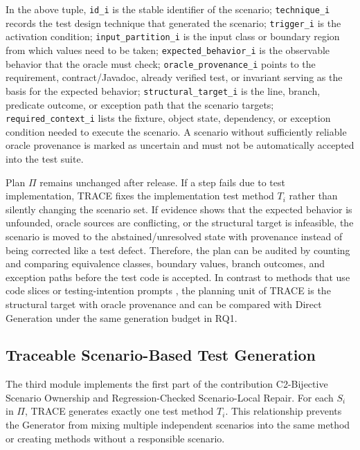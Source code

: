 \documentclass[pdflatex,sn-basic,Numbered,iicol]{sn-jnl}
\begin{document}
In the above tuple, \texttt{id\_i} is the stable identifier of the scenario; \texttt{technique\_i} records the test design technique that generated the scenario; \texttt{trigger\_i} is the activation condition; \texttt{input\_partition\_i} is the input class or boundary region from which values need to be taken; \texttt{expected\_behavior\_i} is the observable behavior that the oracle must check; \texttt{oracle\_provenance\_i} points to the requirement, contract/Javadoc, already verified test, or invariant serving as the basis for the expected behavior; \texttt{structural\_target\_i} is the line, branch, predicate outcome, or exception path that the scenario targets; \texttt{required\_context\_i} lists the fixture, object state, dependency, or exception condition needed to execute the scenario. A scenario without sufficiently reliable oracle provenance is marked as uncertain and must not be automatically accepted into the test suite.

Plan \ensuremath{\Pi} remains unchanged after release. If a step fails due to test implementation, TRACE fixes the implementation test method $T_i$ rather than silently changing the scenario set. If evidence shows that the expected behavior is unfounded, oracle sources are conflicting, or the structural target is infeasible, the scenario is moved to the abstained/unresolved state with provenance instead of being corrected like a test defect. Therefore, the plan can be audited by counting and comparing equivalence classes, boundary values, branch outcomes, and exception paths before the test code is accepted. In contrast to methods that use code slices or testing-intention prompts \cite{bib6,bib7}, the planning unit of TRACE is the structural target with oracle provenance and can be compared with Direct Generation under the same generation budget in RQ1.

\subsection{Traceable Scenario-Based Test Generation}\label{subsec:traceable-generation}

The third module implements the first part of the contribution C2-Bijective Scenario Ownership and Regression-Checked Scenario-Local Repair. For each $S_i$ in \ensuremath{\Pi}, TRACE generates exactly one test method $T_i$. This relationship prevents the Generator from mixing multiple independent scenarios into the same method or creating methods without a responsible scenario.
\end{document}
